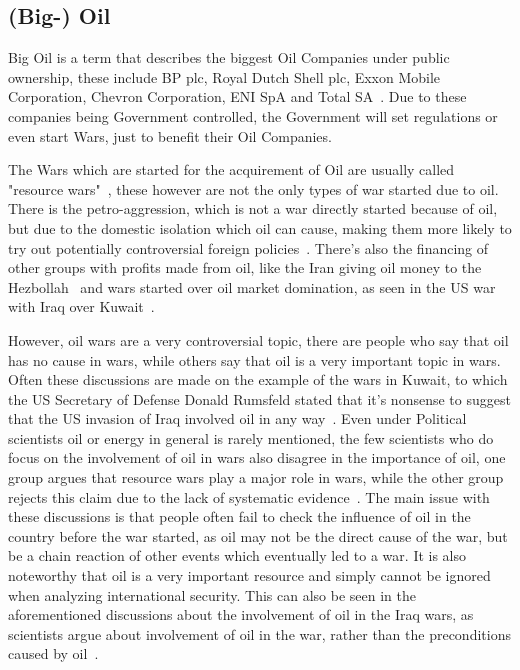 \subsection{(Big-) Oil}
Big Oil is a term that describes the biggest Oil Companies under public ownership, these  include BP plc, Royal Dutch Shell plc, Exxon Mobile Corporation, Chevron Corporation, ENI SpA and Total SA~\cite{financial-dictionary-big-oil}. Due to these companies being Government controlled, the Government will set regulations or even start Wars, just to benefit their Oil Companies.

The Wars which are started for the acquirement of Oil are usually called "resource wars"~\cite{belfercenter-oil-conflict}, these however are not the only types of war started due to oil. There is the petro-aggression, which is not a war directly started because of oil, but due to the domestic isolation which oil can cause, making them more likely to try out potentially controversial foreign policies~\cite{belfercenter-oil-conflict}. There's also the financing of other groups with profits made from oil, like the Iran giving oil money to the Hezbollah~\cite{ny-times-lebanon-hezbollah-fuel} and wars started over oil market domination, as seen in the US war with Iraq over Kuwait~\cite{britannica-persian-gulf-war}.

However, oil wars are a very controversial topic, there are people who say that oil has no cause in wars, while others say that oil is a very important topic in wars. Often these discussions are made on the example of the wars in Kuwait, to which the US Secretary of Defense Donald Rumsfeld stated that it's nonsense to suggest that the US invasion of Iraq involved oil in any way~\cite{stokes_blood_for_oil}. Even under Political scientists oil or energy in general is rarely mentioned, the few scientists who do focus on the involvement of oil in wars also disagree in the importance of oil, one group argues that resource wars play a major role in wars, while the other group rejects this claim due to the lack of systematic evidence~\cite{fueling-fire-jeff-d}. The main issue with these discussions is that people often fail to check the influence of oil in the country before the war started, as oil may not be the direct cause of the war, but be a chain reaction of other events which eventually led to a war. It is also noteworthy that oil is a very important resource and simply cannot be ignored when analyzing international security. This can also be seen in the aforementioned discussions about the involvement of oil in the Iraq wars, as scientists argue about involvement of oil in the war, rather than the preconditions caused by oil~\cite{fueling-fire-jeff-d}.

